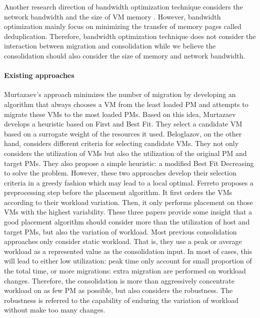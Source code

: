 Another research direction of  bandwidth optimization technique considers the network bandwidth and the size of VM memory \cite{Deshpande:2012jf, Gerofi:2013bd}. However, bandwidth optimization mainly focus on minimizing the transfer of memory pages called deduplication. Therefore, bandwidth optimization technique does not consider the interaction between migration and consolidation while we believe the consolidation should also consider the size of memory and network bandwidth.

\paragraph{Existing approaches}

Murtazaev's approach minimizes the number of migration by developing an algorithm that always chooses a VM from the least loaded PM and attempts to migrate these VMs to the most loaded PMs. 
Based on this idea, Murtazaev develops a heuristic based on First and Best Fit. They select a candidate VM based on a surrogate weight of the resources it used.
Beloglazov, on the other hand, considers different criteria for selecting candidate VMs. They not only considers the utilization of VMs but also the utilization of the original PM and target PMs. They also propose a simple heuristic: a modified Best Fit Decreasing to solve the problem. However, these two approaches develop their selection criteria in a greedy fashion which may lead to a local optimal. 
Ferreto proposes a preprocessing step before the placement algorithm. It first orders the VMs according to their workload variation. Then, it only performs placement on those VMs with  the highest variability. These three papers provide some insight that a good placement algorithm should consider more than the utilization of host and target PMs, but also the variation of workload. 
Most previous consolidation approaches \cite{Viswanathan:2012ej, Feller:2011vs} only consider static workload. That is, they use a peak or average workload as a represented value as the consolidation input. In most of cases, this will lead to either low utilization: peak time only account for small proportion of the total time, or more migrations: extra migration are performed on workload changes. 
Therefore, the consolidation is more than aggressively concentrate workload on as few PM as possible, but also considers the robustness. The robustness is referred to the capability of enduring the variation of workload without make too many changes.

